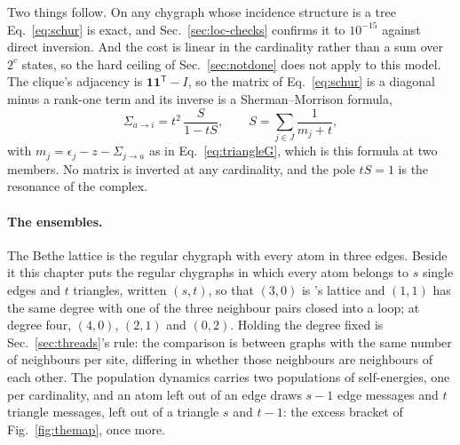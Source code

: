 Two things follow. On any chygraph whose incidence structure is a tree
Eq.~\eqref{eq:schur} is exact, and Sec.~\ref{sec:loc-checks} confirms it to
$10^{-15}$ against direct inversion. And the cost is linear in the
cardinality rather than a sum over $2^{c}$ states, so the hard ceiling of
Sec.~\ref{sec:notdone} does not apply to this model. The clique's adjacency
is $\mathbf{1}\mathbf{1}^{\mathsf T}-I$, so the matrix of
Eq.~\eqref{eq:schur} is a diagonal minus a rank-one term and its inverse is
a Sherman--Morrison formula,
\begin{equation}
  \Sigma_{a\to i}=t^{2}\,\frac{S}{1-tS},
  \qquad S=\sum_{j\in J}\frac{1}{m_{j}+t},
  \label{eq:sherman}
\end{equation}
with $m_{j}=\epsilon_{j}-z-\Sigma_{j\to a}$ as in Eq.~\eqref{eq:triangleG},
which is this formula at two members. No matrix is inverted at any
cardinality, and the pole $tS=1$ is the resonance of the complex.

\paragraph{The ensembles.} The Bethe lattice is the regular chygraph with
every atom in three edges. Beside it this chapter puts the regular chygraphs
in which every atom belongs to $s$ single edges and $t$ triangles, written
$(s,t)$, so that $(3,0)$ is \citeauthor{tonetti2026}'s lattice and
$(1,1)$ has the same degree with one of the three neighbour pairs closed
into a loop; at degree four, $(4,0)$, $(2,1)$ and $(0,2)$. Holding the
degree fixed is Sec.~\ref{sec:threads}'s rule: the comparison is between
graphs with the same number of neighbours per site, differing in whether
those neighbours are neighbours of each other. The population dynamics
carries two populations of self-energies, one per cardinality, and an atom
left out of an edge draws $s-1$ edge messages and $t$ triangle messages,
left out of a triangle $s$ and $t-1$: the excess bracket of
Fig.~\ref{fig:themap}, once more.

